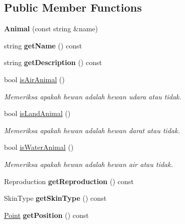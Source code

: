 \subsection*{Public Member Functions}
\begin{DoxyCompactItemize}
\item 
\hypertarget{classAnimal_a4ef4b49b9ed502193d9a1e447af9dca7}{{\bfseries Animal} (const string \&name)}\label{classAnimal_a4ef4b49b9ed502193d9a1e447af9dca7}

\item 
\hypertarget{classAnimal_a1b2cd74cdd5dee4f3673515bf7672a61}{string {\bfseries get\+Name} () const }\label{classAnimal_a1b2cd74cdd5dee4f3673515bf7672a61}

\item 
\hypertarget{classAnimal_a47dd20676cd213e17556ee4e9d4abe10}{string {\bfseries get\+Description} () const }\label{classAnimal_a47dd20676cd213e17556ee4e9d4abe10}

\item 
bool \hyperlink{classAnimal_a5a672a90eff05c178d324c1f4aced9e1}{is\+Air\+Animal} ()
\begin{DoxyCompactList}\small\item\em Memeriksa apakah hewan adalah hewan udara atau tidak. \end{DoxyCompactList}\item 
bool \hyperlink{classAnimal_a95e08def9cf818b28dc46e63d5073811}{is\+Land\+Animal} ()
\begin{DoxyCompactList}\small\item\em Memeriksa apakah hewan adalah hewan darat atau tidak. \end{DoxyCompactList}\item 
bool \hyperlink{classAnimal_aa70cf2a68c33934d139b129307963494}{is\+Water\+Animal} ()
\begin{DoxyCompactList}\small\item\em Memeriksa apakah hewan adalah hewan air atau tidak. \end{DoxyCompactList}\item 
\hypertarget{classAnimal_a4c613dfd36568f939fc3fa3bdfce4044}{Reproduction {\bfseries get\+Reproduction} () const }\label{classAnimal_a4c613dfd36568f939fc3fa3bdfce4044}

\item 
\hypertarget{classAnimal_a5b2464fd9e2e0153942683f2f84f19de}{Skin\+Type {\bfseries get\+Skin\+Type} () const }\label{classAnimal_a5b2464fd9e2e0153942683f2f84f19de}

\item 
\hypertarget{classAnimal_a2b389702ed4503aae6410eec8c655a40}{\hyperlink{classPoint}{Point} {\bfseries get\+Position} () const }\label{classAnimal_a2b389702ed4503aae6410eec8c655a40}


\end{DoxyCompactItemize}
